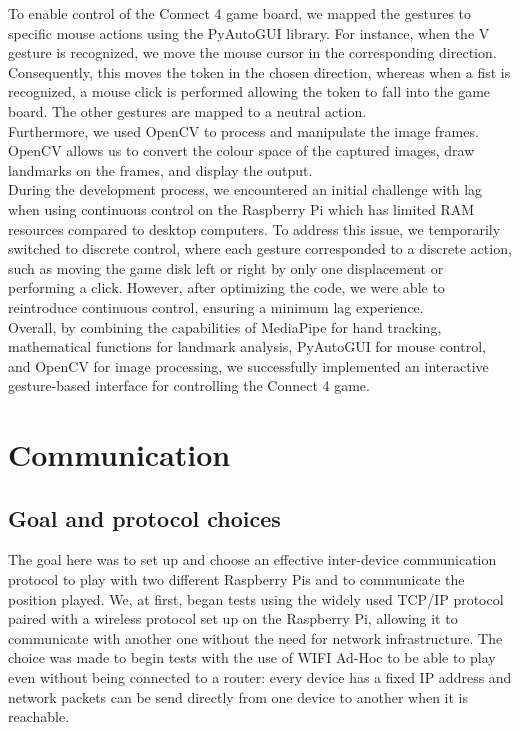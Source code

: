 \documentclass[12pt, a4paper, oneside]{report}
\begin{document}
	To enable control of the Connect 4 game board, we mapped the gestures to specific mouse actions using the PyAutoGUI library. For instance, when the V gesture is recognized, we move the mouse cursor in the corresponding direction. Consequently, this moves the token in the chosen direction, whereas when a fist is recognized, a mouse click is performed allowing the token to fall into the game board. The other gestures are mapped to a neutral action. \\

	Furthermore, we used OpenCV to process and manipulate the image frames. OpenCV allows us to convert the colour space of the captured images, draw landmarks on the frames, and display the output. \\

	During the development process, we encountered an initial challenge with lag when using continuous control on the Raspberry Pi which has limited RAM resources compared to desktop computers. To address this issue, we temporarily switched to discrete control, where each gesture corresponded to a discrete action, such as moving the game disk left or right by only one displacement or performing a click. However, after optimizing the code, we were able to reintroduce continuous control, ensuring a minimum lag experience. \\

	Overall, by combining the capabilities of MediaPipe for hand tracking, mathematical functions for landmark analysis, PyAutoGUI for mouse control, and OpenCV for image processing, we successfully implemented an interactive gesture-based interface for controlling the Connect 4 game. \\

	\section{Communication}
	\subsection{Goal and protocol choices}
	The goal here was to set up and choose an effective inter-device communication protocol to play with two different Raspberry Pis and to communicate the position played. We, at first, began tests using the widely used TCP/IP protocol paired with a wireless protocol set up on the Raspberry Pi, allowing it to communicate with another one without the need for network infrastructure. The choice was made to begin tests with the use of WIFI Ad-Hoc to be able to play even without being connected to a router: every device has a fixed IP address and network packets can be send directly from one device to another when it is reachable. \\
\end{document}
